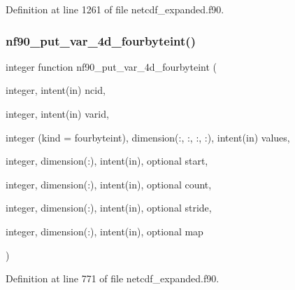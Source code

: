Definition at line 1261 of file netcdf\+\_\+expanded.\+f90.

\mbox{\label{netcdf__expanded_8f90_a18011e84d779f3fabbbac8639343127d}} 
\subsubsection{\texorpdfstring{nf90\+\_\+put\+\_\+var\+\_\+4d\+\_\+fourbyteint()}{nf90\_put\_var\_4d\_fourbyteint()}}
{\footnotesize\ttfamily integer function nf90\+\_\+put\+\_\+var\+\_\+4d\+\_\+fourbyteint (\begin{DoxyParamCaption}\item[{integer, intent(in)}]{ncid,  }\item[{integer, intent(in)}]{varid,  }\item[{integer (kind = fourbyteint), dimension(\+:, \+:, \+:, \+:), intent(in)}]{values,  }\item[{integer, dimension(\+:), intent(in), optional}]{start,  }\item[{integer, dimension(\+:), intent(in), optional}]{count,  }\item[{integer, dimension(\+:), intent(in), optional}]{stride,  }\item[{integer, dimension(\+:), intent(in), optional}]{map }\end{DoxyParamCaption})}



Definition at line 771 of file netcdf\+\_\+expanded.\+f90.

\mbox{\label{netcdf__expanded_8f90_a17d00c5ef5644148863f9676a3d4657e}} 
